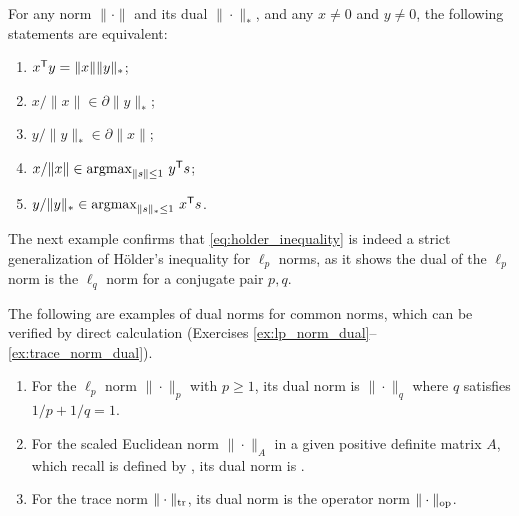 \begin{Theorem}
\label{thm:dual_norm_subgradients}
For any norm $\|\cdot\|$ and its dual $\|\cdot\|_*$, and any $x \not= 0$ and $y 
\not= 0$, the following statements are equivalent:
\begin{enumerate}[label=(\roman*)]
\item $x^{\mathsf{T}} y = \|x\| \|y\|_*$;
\item $x/\|x\| \in \partial \|y\|_*$; 
\item $y/\|y\|_* \in \partial \|x\|$;
\item $x/\|x\| \in \operatorname*{argmax}_{\|s\| \leq 1} \, y^{\mathsf{T}} s$; 
\item $y/\|y\|_* \in \operatorname*{argmax}_{\|s\|_* \leq 1} \, x^{\mathsf{T}} s$. 
\end{enumerate}
\end{Theorem}

The next example confirms that \eqref{eq:holder_inequality} is indeed a strict 
generalization of H{\"o}lder's inequality for $\ell_p$ norms, as it shows the
dual of the $\ell_p$ norm is the $\ell_q$ norm for a conjugate pair $p,q$.      

\begin{Example}
The following are examples of dual norms for common norms, which can be verified
by direct calculation (Exercises \ref{ex:lp_norm_dual}--\ref{ex:trace_norm_dual}). 

\begin{enumerate}[label=\alph*., ref=\alph*]
\item {} 
For the $\ell_p$ norm $\|\cdot\|_p$ with $p \geq 1$, its dual norm is
$\|\cdot\|_q$ where $q$ satisfies $1/p + 1/q = 1$.  

\item {}  
For the scaled Euclidean norm $\|\cdot\|_A$ in a given positive definite
matrix $A$, which recall is defined by ,
its dual norm is .  

\item {}  
For the trace norm $\|\cdot\|_{\operatorname{tr}}$, its dual norm is the operator norm
$\|\cdot\|_{\mathrm{op}}$.   
\end{enumerate}
\end{Example}

